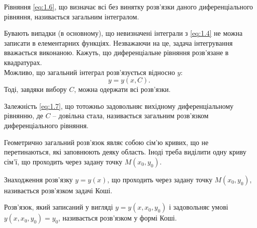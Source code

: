 \begin{definition}
	Рівняння \eqref{eq:1.6}, що визначає всі без винятку розв’язки даного диференціального рівняння, називається загальним інтегралом.
\end{definition}

Бувають випадки (в основному), що невизначені інтеграли з \eqref{eq:1.4} не можна записати в елементарних функціях. Незважаючи на це, задача інтегрування вважається виконаною. Кажуть, що диференціальне рівняння розв’язане в квадратурах. \\

Можливо, що загальний інтеграл розв’язується відносно $y$: 
\begin{equation}
	\label{eq:1.7}
	y = y(x, C).
\end{equation} Тоді, завдяки вибору $C$, можна одержати всі розв’язки. 

\begin{definition}
	Залежність \eqref{eq:1.7}, що тотожньо задовольняє вихідному диференціальному рівнянню, де $C$ -- довільна стала, називається загальним розв’язком диференціального рівняння.
\end{definition}

Геометрично загальний розв’язок являє собою сім’ю кривих, що не перетинаються, які заповнюють деяку область. Іноді треба виділити одну криву сім’ї, що проходить через задану точку $M(x_0, y_0)$.

\begin{definition}
	Знаходження розв’язку $y = y(x)$, що проходить через задану точку $M(x_0, y_0)$, називається розв’язком задачі Коші.
\end{definition}

\begin{definition}
	Розв’язок, який записаний у вигляді $y = y(x, x_0, y_0)$ і задовольняє умові $y(x, x_0, y_0) = y_0$, називається розв’язком у формі Коші.
\end{definition}